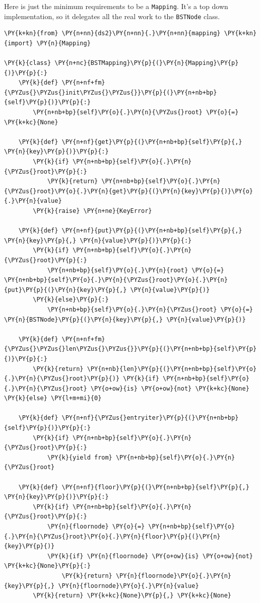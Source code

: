 Here is just the minimum requirements to be a \texttt{Mapping}.
It's a top down implementation, so it delegates all the real work to the \texttt{BSTNode} class.

\begin{Verbatim}[commandchars=\\\{\}]
\PY{k+kn}{from} \PY{n+nn}{ds2}\PY{n+nn}{.}\PY{n+nn}{mapping} \PY{k+kn}{import} \PY{n}{Mapping}

\PY{k}{class} \PY{n+nc}{BSTMapping}\PY{p}{(}\PY{n}{Mapping}\PY{p}{)}\PY{p}{:}
    \PY{k}{def} \PY{n+nf+fm}{\PYZus{}\PYZus{}init\PYZus{}\PYZus{}}\PY{p}{(}\PY{n+nb+bp}{self}\PY{p}{)}\PY{p}{:}
        \PY{n+nb+bp}{self}\PY{o}{.}\PY{n}{\PYZus{}root} \PY{o}{=} \PY{k+kc}{None}

    \PY{k}{def} \PY{n+nf}{get}\PY{p}{(}\PY{n+nb+bp}{self}\PY{p}{,} \PY{n}{key}\PY{p}{)}\PY{p}{:}
        \PY{k}{if} \PY{n+nb+bp}{self}\PY{o}{.}\PY{n}{\PYZus{}root}\PY{p}{:}
            \PY{k}{return} \PY{n+nb+bp}{self}\PY{o}{.}\PY{n}{\PYZus{}root}\PY{o}{.}\PY{n}{get}\PY{p}{(}\PY{n}{key}\PY{p}{)}\PY{o}{.}\PY{n}{value}
        \PY{k}{raise} \PY{n+ne}{KeyError}

    \PY{k}{def} \PY{n+nf}{put}\PY{p}{(}\PY{n+nb+bp}{self}\PY{p}{,} \PY{n}{key}\PY{p}{,} \PY{n}{value}\PY{p}{)}\PY{p}{:}
        \PY{k}{if} \PY{n+nb+bp}{self}\PY{o}{.}\PY{n}{\PYZus{}root}\PY{p}{:}
            \PY{n+nb+bp}{self}\PY{o}{.}\PY{n}{root} \PY{o}{=} \PY{n+nb+bp}{self}\PY{o}{.}\PY{n}{\PYZus{}root}\PY{o}{.}\PY{n}{put}\PY{p}{(}\PY{n}{key}\PY{p}{,} \PY{n}{value}\PY{p}{)}
        \PY{k}{else}\PY{p}{:}
            \PY{n+nb+bp}{self}\PY{o}{.}\PY{n}{\PYZus{}root} \PY{o}{=} \PY{n}{BSTNode}\PY{p}{(}\PY{n}{key}\PY{p}{,} \PY{n}{value}\PY{p}{)}

    \PY{k}{def} \PY{n+nf+fm}{\PYZus{}\PYZus{}len\PYZus{}\PYZus{}}\PY{p}{(}\PY{n+nb+bp}{self}\PY{p}{)}\PY{p}{:}
        \PY{k}{return} \PY{n+nb}{len}\PY{p}{(}\PY{n+nb+bp}{self}\PY{o}{.}\PY{n}{\PYZus{}root}\PY{p}{)} \PY{k}{if} \PY{n+nb+bp}{self}\PY{o}{.}\PY{n}{\PYZus{}root} \PY{o+ow}{is} \PY{o+ow}{not} \PY{k+kc}{None} \PY{k}{else} \PY{l+m+mi}{0}

    \PY{k}{def} \PY{n+nf}{\PYZus{}entryiter}\PY{p}{(}\PY{n+nb+bp}{self}\PY{p}{)}\PY{p}{:}
        \PY{k}{if} \PY{n+nb+bp}{self}\PY{o}{.}\PY{n}{\PYZus{}root}\PY{p}{:}
            \PY{k}{yield from} \PY{n+nb+bp}{self}\PY{o}{.}\PY{n}{\PYZus{}root}

    \PY{k}{def} \PY{n+nf}{floor}\PY{p}{(}\PY{n+nb+bp}{self}\PY{p}{,} \PY{n}{key}\PY{p}{)}\PY{p}{:}
        \PY{k}{if} \PY{n+nb+bp}{self}\PY{o}{.}\PY{n}{\PYZus{}root}\PY{p}{:}
            \PY{n}{floornode} \PY{o}{=} \PY{n+nb+bp}{self}\PY{o}{.}\PY{n}{\PYZus{}root}\PY{o}{.}\PY{n}{floor}\PY{p}{(}\PY{n}{key}\PY{p}{)}
            \PY{k}{if} \PY{n}{floornode} \PY{o+ow}{is} \PY{o+ow}{not} \PY{k+kc}{None}\PY{p}{:}
                \PY{k}{return} \PY{n}{floornode}\PY{o}{.}\PY{n}{key}\PY{p}{,} \PY{n}{floornode}\PY{o}{.}\PY{n}{value}
        \PY{k}{return} \PY{k+kc}{None}\PY{p}{,} \PY{k+kc}{None}


\end{Verbatim}
